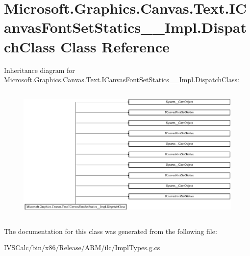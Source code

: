 \hypertarget{class_microsoft_1_1_graphics_1_1_canvas_1_1_text_1_1_i_canvas_font_set_statics_____impl_1_1_dispatch_class}{}\section{Microsoft.\+Graphics.\+Canvas.\+Text.\+I\+Canvas\+Font\+Set\+Statics\+\_\+\+\_\+\+Impl.\+Dispatch\+Class Class Reference}
\label{class_microsoft_1_1_graphics_1_1_canvas_1_1_text_1_1_i_canvas_font_set_statics_____impl_1_1_dispatch_class}
Inheritance diagram for Microsoft.\+Graphics.\+Canvas.\+Text.\+I\+Canvas\+Font\+Set\+Statics\+\_\+\+\_\+\+Impl.\+Dispatch\+Class\+:\begin{figure}[H]
\begin{center}
\leavevmode
\includegraphics[height=6.814159cm]{class_microsoft_1_1_graphics_1_1_canvas_1_1_text_1_1_i_canvas_font_set_statics_____impl_1_1_dispatch_class}
\end{center}
\end{figure}


The documentation for this class was generated from the following file\+:\begin{DoxyCompactItemize}
\item 
I\+V\+S\+Calc/bin/x86/\+Release/\+A\+R\+M/ilc/Impl\+Types.\+g.\+cs\end{DoxyCompactItemize}
